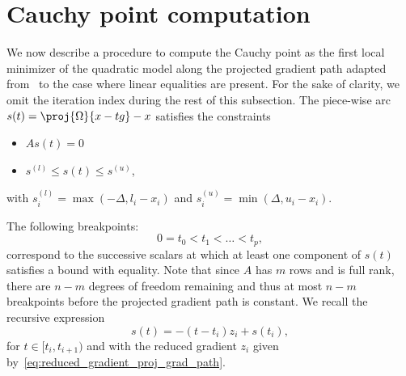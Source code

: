 \section{Cauchy point computation}\label{appendix:cauchy_point_computation}

We now describe a procedure to compute the Cauchy point as the first local minimizer of the quadratic model along the projected gradient path adapted from~\cite{conn-etal:1988a} to the case where linear equalities are present. For the sake of clarity, we omit the iteration index during the rest of this subsection. 
The piece-wise arc $s(t) = \proj{\Omega}{x-tg}-x$ satisfies the constraints
\begin{itemize}
	\item $As(t) = 0$
	\item $s^{(l)} \le s(t) \le s^{(u)}$,
\end{itemize}
with $s^{(l)}_i = \max(-\Delta,l_i-x_i)$ and $s^{(u)}_i = \min(\Delta,u_i-x_i)$.

The following breakpoints:
\begin{equation*}
	0=t_0 < t_1 < \ldots < t_p,
\end{equation*} 
correspond to the successive scalars at which at least one component of $s(t)$ satisfies a bound with equality. Note that since $A$ has $m$ rows and is full rank, there are $n-m$ degrees of freedom remaining  and thus at most $n-m$ breakpoints before the projected gradient path is constant. We recall the recursive expression
\[s(t) = -(t-t_i)z_i + s(t_i),\]
for $t\in [t_i,t_{i+1})$ and with the reduced gradient $z_i$ given by~\eqref{eq:reduced_gradient_proj_grad_path}.

